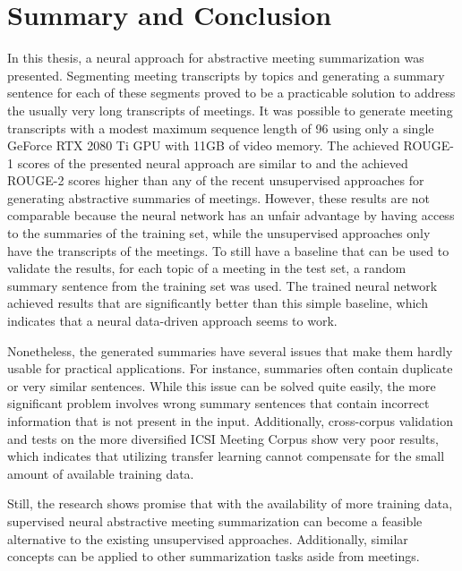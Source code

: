 \chapter{Summary and Conclusion}\label{ch:summary-and-conclusion}

In this thesis, a neural approach for abstractive meeting summarization was presented.
Segmenting meeting transcripts by topics and generating a summary sentence for each of these segments proved to be a practicable solution to address the usually very long transcripts of meetings.
It was possible to generate meeting transcripts with a modest maximum sequence length of 96 using only a single GeForce RTX 2080 Ti GPU with 11GB of video memory.
The achieved ROUGE-1 scores of the presented neural approach are similar to and the achieved ROUGE-2 scores higher than any of the recent unsupervised approaches for generating abstractive summaries of meetings.
However, these results are not comparable because the neural network has an unfair advantage by having access to the summaries of the training set, while the unsupervised approaches only have the transcripts of the meetings.
To still have a baseline that can be used to validate the results, for each topic of a meeting in the test set, a random summary sentence from the training set was used.
The trained neural network achieved results that are significantly better than this simple baseline, which indicates that a neural data-driven approach seems to work.

Nonetheless, the generated summaries have several issues that make them hardly usable for practical applications.
For instance, summaries often contain duplicate or very similar sentences.
While this issue can be solved quite easily, the more significant problem involves wrong summary sentences that contain incorrect information that is not present in the input.
Additionally, cross-corpus validation and tests on the more diversified ICSI Meeting Corpus show very poor results, which indicates that utilizing transfer learning cannot compensate for the small amount of available training data.

Still, the research shows promise that with the availability of more training data, supervised neural abstractive meeting summarization can become a feasible alternative to the existing unsupervised approaches.
Additionally, similar concepts can be applied to other summarization tasks aside from meetings.